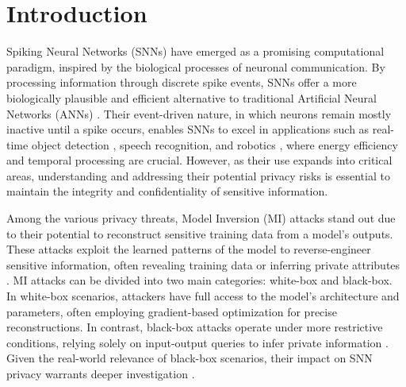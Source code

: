 \section{Introduction}
\label{sec:intro}

\noindent
Spiking Neural Networks (SNNs) have emerged as a promising computational paradigm, inspired by the biological processes of neuronal communication. By processing information through discrete spike events, SNNs offer a more biologically plausible and efficient alternative to traditional Artificial Neural Networks (ANNs) \cite{nunes2022spiking}. Their event-driven nature, in which neurons remain mostly inactive until a spike occurs, enables SNNs to excel in applications such as real-time object detection \cite{cordone2022object, barchid2021deep}, speech recognition\cite{wu2020deep}, and robotics \cite{bing2018survey}, where energy efficiency and temporal processing are crucial. However, as their use expands into critical areas, understanding and addressing their potential privacy risks is essential to maintain the integrity and confidentiality of sensitive information.



Among the various privacy threats, Model Inversion (MI) attacks stand out due to their potential to reconstruct sensitive training data from a model's outputs. These attacks exploit the learned patterns of the model to reverse-engineer sensitive information, often revealing training data or inferring private attributes \cite{fredrikson2015model}. MI attacks can be divided into two main categories: white-box and black-box. In white-box scenarios, attackers have full access to the model's architecture and parameters, often employing gradient-based optimization for precise reconstructions. In contrast, black-box attacks operate under more restrictive conditions, relying solely on input-output queries to infer private information  \cite{dibbo2023sok}. Given the real-world relevance of black-box scenarios, their impact on SNN privacy warrants deeper investigation \cite{dionysiou2023exploring}.

